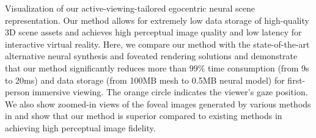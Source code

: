 \begin{teaserfigure}
  \centering
 {%
 Visualization of our active-viewing-tailored egocentric neural scene representation.
 Our method allows for extremely low data storage of high-quality 3D scene assets and achieves high perceptual image quality and low latency for interactive virtual reality. Here, we compare our method with the state-of-the-art alternative neural synthesis \protect\cite{mildenhall2020nerf} and foveated rendering solutions \cite{perry2002gaze,Patney:2016:TFR} and demonstrate that our method significantly reduces more than $99\%$ time consumption (from 9s to 20ms) and data storage (from 100MB mesh to 0.5MB neural model) for first-person immersive viewing. The orange circle indicates the viewer's gaze position. We also show zoomed-in views of the foveal images generated by various methods in  and show that our method is superior compared to existing methods in achieving high perceptual image fidelity.%
}
\end{teaserfigure}
